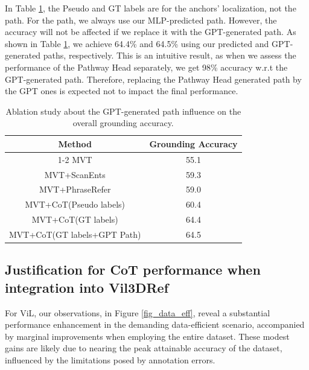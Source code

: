 In Table \ref{tab_GPTgenerated_path_influence}, the Pseudo and GT labels are for the anchors' localization, not the path.
For the path, we always use our MLP-predicted path.
However, the accuracy will not be affected if we replace it with the GPT-generated path.
As shown in Table \ref{tab_GPTgenerated_path_influence}, we achieve 64.4\% and 64.5\% using our predicted and GPT-generated paths, respectively.
This is an intuitive result, as when we assess the performance of the Pathway Head separately, we get 98\% accuracy w.r.t the GPT-generated path.
Therefore, replacing the Pathway Head generated path by the GPT ones is expected not to impact the final performance.

\begin{table}
\centering
\caption{Ablation study about the GPT-generated path influence on the overall grounding accuracy.}
\begin{tabular}{cc}
        \toprule[1.5pt]
        \textbf{Method} & \textbf{Grounding Accuracy} \\
        \cmidrule(r){1-2}
        MVT & 55.1 \\
        MVT+ScanEnts & 59.3 \\
        MVT+PhraseRefer & 59.0 \\
        MVT+CoT(Pseudo labels) & 60.4 \\
        MVT+CoT(GT labels) & 64.4 \\
        MVT+CoT(GT labels+GPT Path) & 64.5 \\
        \bottomrule[1.5pt]
    \end{tabular}
\label{tab_GPTgenerated_path_influence}
\end{table}

\subsection{Justification for CoT performance when integration into Vil3DRef}
\label{appendix_Justification_vil}
For ViL, our observations, in Figure \ref{fig_data_eff}, reveal a substantial performance enhancement in the demanding data-efficient scenario, accompanied by marginal improvements when employing the entire dataset. 
These modest gains are likely due to nearing the peak attainable accuracy of the dataset, influenced by the limitations posed by annotation errors.

